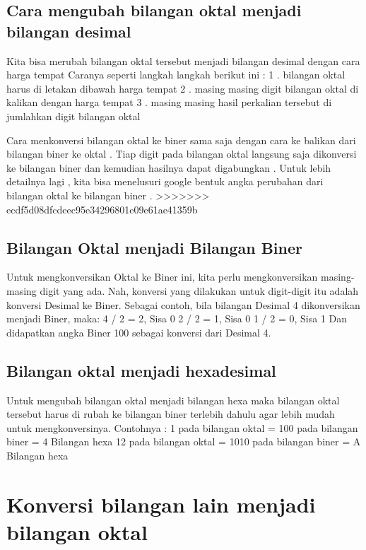 	\subsection{Cara mengubah bilangan oktal menjadi bilangan desimal}

	Kita bisa merubah bilangan oktal tersebut menjadi bilangan desimal dengan cara harga tempat
	Caranya seperti langkah langkah berikut ini :
	1 . bilangan oktal harus di letakan dibawah harga tempat
	2 . masing masing digit bilangan oktal di kalikan dengan harga tempat
	3 . masing masing hasil perkalian tersebut di jumlahkan digit bilangan oktal  
	
	Cara menkonversi bilangan oktal ke biner sama saja dengan cara ke balikan dari bilangan biner ke oktal . Tiap digit pada bilangan oktal langsung saja dikonversi ke bilangan biner dan kemudian hasilnya dapat digabungkan . Untuk lebih detailnya lagi , kita bisa menelusuri google bentuk angka perubahan dari bilangan oktal ke bilangan biner .
	>>>>>>> ecdf5d08dfcdeec95e34296801e09e61ae41359b

	\subsection {Bilangan Oktal menjadi Bilangan Biner}
	Untuk mengkonversikan Oktal ke Biner ini, kita perlu mengkonversikan masing-masing digit yang ada. Nah, konversi yang dilakukan untuk digit-digit itu adalah konversi Desimal ke Biner. Sebagai contoh, bila bilangan Desimal 4 dikonversikan menjadi Biner, maka:
	4  / 2 = 2, Sisa 0
	2 / 2 = 1, Sisa 0
	1 / 2 = 0, Sisa 1
	Dan didapatkan angka Biner 100 sebagai konversi dari Desimal 4.

	\subsection{Bilangan oktal menjadi hexadesimal}
	Untuk mengubah bilangan oktal menjadi bilangan hexa maka bilangan oktal tersebut harus di rubah ke bilangan biner terlebih dahulu agar lebih mudah untuk mengkonversinya.
Contohnya :
1 pada bilangan oktal = 100 pada bilangan biner = 4 Bilangan hexa
12 pada bilangan oktal = 1010 pada bilangan biner = A Bilangan hexa

\section {Konversi bilangan lain menjadi bilangan oktal}
	
